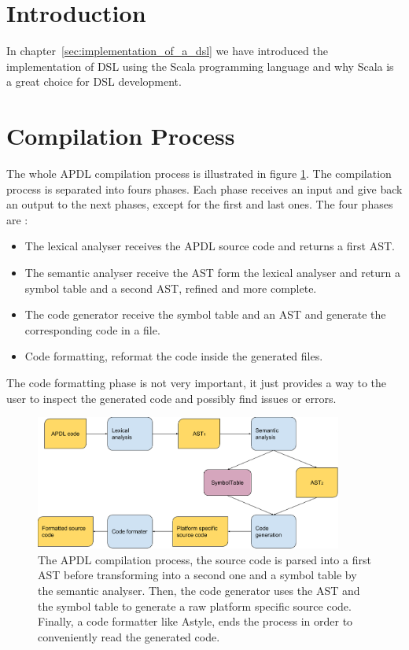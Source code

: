 \label{chap:dsl_implementation}

\section{Introduction}
\label{sec:implementation_intro}

In chapter~\ref{sec:implementation_of_a_dsl} we have introduced the
implementation of \gls{DSL} using the Scala programming language and why Scala
is a great choice for \gls{DSL} development.

\section{Compilation Process}
\label{sec:compilation_process}

The whole \gls{APDL} compilation process is illustrated in figure
\ref{fig:apdl_compilation_process}. The compilation process is separated into
fours phases. Each phase receives an input and give back an output to the next
phases, except for the first and last ones. The four phases are :
\begin{itemize}
\item The lexical analyser receives the APDL source code and returns a first \gls{AST}.
\item The semantic analyser receive the \gls{AST} form the lexical analyser and
  return a symbol table and a second \gls{AST}, refined and more complete.
\item The code generator receive the symbol table and an \gls{AST} and generate
  the corresponding code in a file.
\item Code formatting, reformat the code inside the generated files.
\end{itemize}

The code formatting phase is not very important, it just provides a way to the
user to inspect the generated code and possibly find issues or errors.

\begin{figure}[!htbp]
  \centering
  \includegraphics[width=0.9\textwidth]{img/compilation_process}
  \caption[APDL compilation process]{The APDL compilation process, the source
    code is parsed into a first \gls{AST} before transforming into a second one
    and a symbol table by the semantic analyser. Then, the code generator uses
    the \gls{AST} and the symbol table to generate a raw platform specific
    source code. Finally, a code formatter like Astyle\cite{TalDavidson}, ends the
    process in order to conveniently read the generated code.}
  \label{fig:apdl_compilation_process}
\end{figure}

